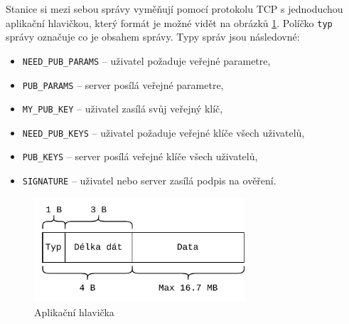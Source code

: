 Stanice si mezi sebou správy vyměňují pomocí protokolu TCP s jednoduchou aplikační hlavičkou, který formát je možné vidět na obrázků \ref{header}. Políčko \texttt{typ} správy označuje co je obsahem správy. Typy správ jsou následovné:
\begin{itemize}
  \item \texttt{NEED\_PUB\_PARAMS} -- uživatel požaduje veřejné parametre,
  \item \texttt{PUB\_PARAMS} -- server posílá veřejné parametre,
  \item \texttt{MY\_PUB\_KEY} -- uživatel zasílá svůj veřejný klíč,
  \item \texttt{NEED\_PUB\_KEYS} -- uživatel požaduje veřejné klíče všech uživatelů,
  \item \texttt{PUB\_KEYS} -- server posílá veřejné klíče všech uživatelů,
  \item \texttt{SIGNATURE} -- uživatel nebo server zasílá podpis na ověření.
\end{itemize}

\begin{figure}[htbp]
  \centering
  \includegraphics[width=0.7\textwidth]{img/header.pdf}
  \caption{Aplikační hlavička}
  \label{header}
\end{figure}


